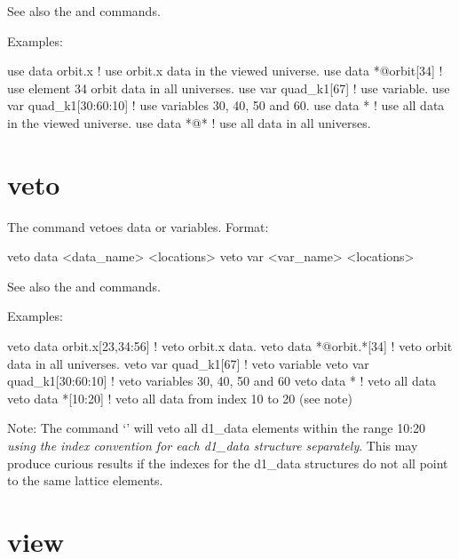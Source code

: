 {{{\vskip 0.2in 

See also the  and  commands.

Examples:
\begin{example}
  use data orbit.x             ! use orbit.x data in the viewed universe.
  use data *@orbit[34]         ! use element 34 orbit data in all universes.
  use var quad_k1[67]          ! use variable.
  use var quad_k1[30:60:10]    ! use variables 30, 40, 50 and 60.
  use data *                   ! use all data in the viewed universe.
  use data *@*                 ! use all data in all universes.
\end{example}


\section{veto}
\label{s:veto}

The  command vetoes data or variables. Format:
\begin{example}
  veto data <data_name> <locations>
  veto var <var_name> <locations>
\end{example}

\vskip 0.1in 

See also the  and  commands.

Examples:
\begin{example}
  veto data orbit.x[23,34:56]  ! veto orbit.x data.
  veto data *@orbit.*[34]      ! veto orbit data in all universes.
  veto var quad_k1[67]         ! veto variable
  veto var quad_k1[30:60:10]   ! veto variables 30, 40, 50 and 60
  veto data *                  ! veto all data
  veto data *[10:20]           ! veto all data from index 10 to 20 (see note)
\end{example}

Note: The command `' will veto all d1\_data elements
within the range 10:20 \textit{using the index convention for each d1\_data
structure separately}. This may produce curious results if the
indexes for the d1\_data structures do not all point to the same lattice
elements. 

\section{view}
\label{s:view}

}}}

